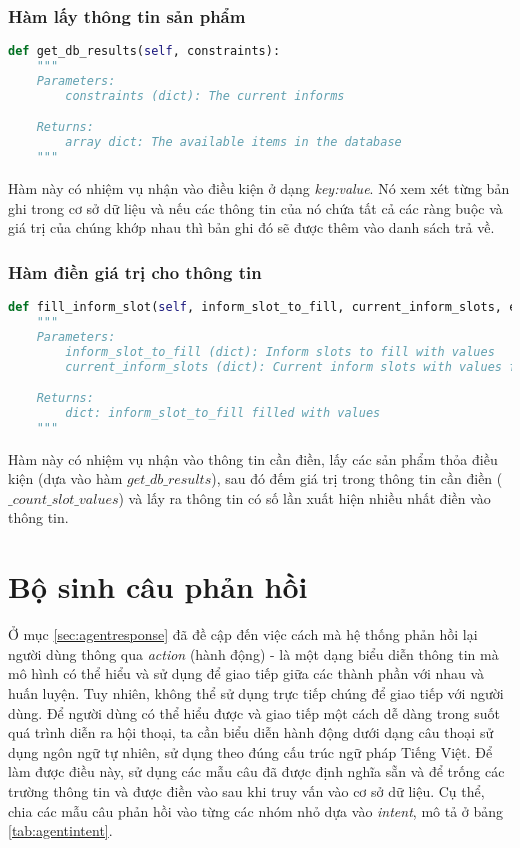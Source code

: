 \subsubsection{Hàm lấy thông tin sản phẩm}

\renewcommand{\lstlistingname}{Hàm}
\begin{lstlisting}[caption={Hàm lấy thông tin sản phẩm},language=python]
def get_db_results(self, constraints):
    """
    Parameters:
        constraints (dict): The current informs

    Returns:
        array dict: The available items in the database
    """
\end{lstlisting}

Hàm này có nhiệm vụ nhận vào điều kiện ở dạng \textit{key:value}.
Nó xem xét từng bản ghi trong cơ sở dữ liệu và nếu các thông tin
của nó chứa tất cả các ràng buộc và giá trị của chúng khớp nhau
thì bản ghi đó sẽ được thêm vào danh sách trả về.

\subsubsection{Hàm điền giá trị cho thông tin}

\renewcommand{\lstlistingname}{Hàm}
\begin{lstlisting}[caption={Hàm điền giá trị cho thông tin},language=python]
def fill_inform_slot(self, inform_slot_to_fill, current_inform_slots, entity_list):
    """
    Parameters:
        inform_slot_to_fill (dict): Inform slots to fill with values
        current_inform_slots (dict): Current inform slots with values from the StateTracker

    Returns:
        dict: inform_slot_to_fill filled with values
    """
\end{lstlisting}

Hàm này có nhiệm vụ nhận vào thông tin cần điền, lấy các sản phẩm
thỏa điều kiện (dựa vào hàm $get\_db\_results$), sau đó đếm giá trị
trong thông tin cần điền ($\_count\_slot\_values$) và lấy ra
thông tin có số lần xuất hiện nhiều nhất điền vào thông tin.

\section{Bộ sinh câu phản hồi}
Ở mục \ref{sec:agentresponse} đã đề cập đến việc cách mà hệ thống
phản hồi lại người dùng thông qua \textit{action} (hành động) - là
một dạng biểu diễn thông tin mà mô hình có thể hiểu và sử dụng để
giao tiếp giữa các thành phần với nhau và huấn luyện. Tuy nhiên,
không thể sử dụng trực tiếp chúng để giao tiếp với người dùng.
Để người dùng có thể hiểu được và giao tiếp một cách dễ dàng
trong suốt quá trình diễn ra hội thoại, ta cần biểu diễn hành động
dưới dạng câu thoại sử dụng ngôn ngữ tự nhiên, sử dụng theo đúng
cấu trúc ngữ pháp Tiếng Việt. Để làm được điều này, sử dụng các
mẫu câu đã được định nghĩa sẵn và để trống các trường thông tin
và được điền vào sau khi truy vấn vào cơ sở dữ liệu. Cụ thể, chia
các mẫu câu phản hồi vào từng các nhóm nhỏ dựa vào \textit{intent},
mô tả ở bảng \ref{tab:agentintent}.

